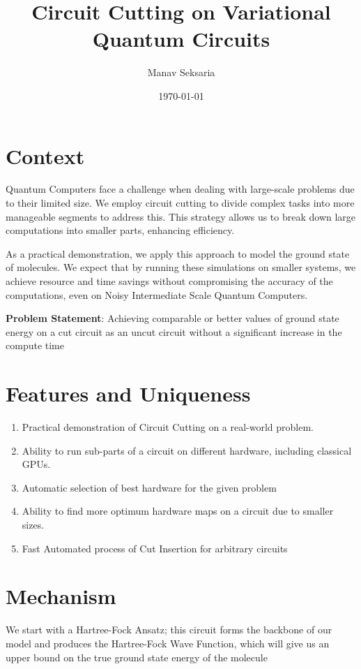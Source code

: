 \documentclass[hidelinks]{book}
\title{Circuit Cutting on Variational Quantum Circuits}
\author{Manav Seksaria}
\date{\today}
\numberwithin{equation}{section}
\begin{document}
\maketitle

\pagestyle{fancy}
\fancyhead{}
\fancyfoot{}

\section{Context}\label{objective}
Quantum Computers face a challenge when dealing with large-scale problems due to their limited size. We employ circuit cutting to divide complex tasks into more manageable segments to address this. This strategy allows us to break down large computations into smaller parts, enhancing efficiency.

As a practical demonstration, we apply this approach to model the ground state of molecules. We expect that by running these simulations on smaller systems, we achieve resource and time savings without compromising the accuracy of the computations, even on Noisy Intermediate Scale Quantum Computers.

\textbf{Problem Statement}: Achieving comparable or better values of ground state energy on a cut circuit as an uncut circuit without a significant increase in the compute time


\section{Features and Uniqueness}\label{objective}
\begin{enumerate}
  \item Practical demonstration of Circuit Cutting on a real-world problem.
  \item Ability to run sub-parts of a circuit on different hardware, including classical GPUs.
  \item Automatic selection of best hardware for the given problem
  \item Ability to find more optimum hardware maps on a circuit due to smaller sizes.
  \item Fast Automated process of Cut Insertion for arbitrary circuits
\end{enumerate}

\section{Mechanism}\label{variational-quantum-circuit}
We start with a Hartree-Fock Ansatz; this circuit forms the backbone of our model and produces the Hartree-Fock Wave Function, which will give us an upper bound on the true ground state energy of the molecule
\end{document}
